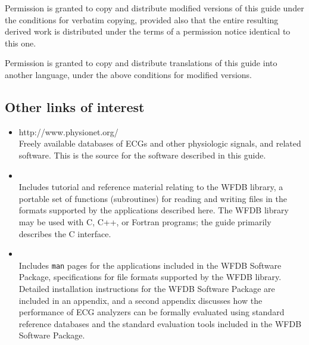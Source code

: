 \documentclass[twoside]{book}
\begin{document}

\vspace{0.2 in}
\noindent
Permission is granted to copy and distribute modified versions of this
guide under the conditions for verbatim copying, provided also that the
entire resulting derived work is distributed under the terms of a
permission notice identical to this one.

\vspace{0.2 in}
\noindent
Permission is granted to copy and distribute translations of this guide
into another language, under the above conditions for modified versions.

\begin{htmlonly}
\section*{Other links of interest}

\begin{itemize}
\item
{}
{http://www.physionet.org/} \\
Freely available databases of ECGs and other physiologic signals,
and related software.  This is the source for the software described in this
guide.

\item
{} \\
Includes tutorial and reference material relating to the WFDB library,
a portable set of functions (subroutines) for reading and writing files in the
formats supported by the applications described here.  The WFDB library may be
used with C, C++, or Fortran programs;  the guide primarily describes the C
interface.

\item
{} \\
Includes {\tt man} pages for the applications included in the WFDB Software
Package, specifications for file formats supported by the WFDB library.
Detailed installation instructions for the WFDB Software Package are included
in an appendix, and a second appendix discusses how the performance of ECG
analyzers can be formally evaluated using standard reference databases and the
standard evaluation tools included in the WFDB Software Package.
\end{itemize}
\end{htmlonly}
\newpage
\setcounter{page}{1}
\tableofcontents
\end{document}
